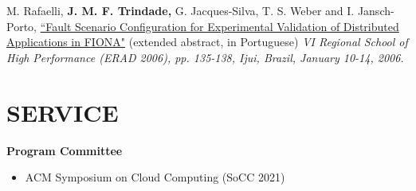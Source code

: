 \documentclass[line,margin]{res}
\begin{document}
\begin{resume}
M. Rafaelli, \textbf{J. M. F. Trindade,} G. Jacques-Silva, T. S. Weber and I. Jansch-Porto, \href{http://joanatrindade.wikidot.com/local--files/curriculum/erad2006.pdf}{``Fault Scenario Configuration for Experimental Validation of Distributed Applications in FIONA"} (extended abstract, in Portuguese) \textit{VI Regional School of High Performance (ERAD 2006), pp. 135-138, Ijui, Brazil, January 10-14, 2006.}




\section{SERVICE}
  \textbf{Program Committee}
  \begin{itemize}  \itemsep -2pt
  \item ACM Symposium on Cloud Computing (SoCC 2021)
  \end{itemize}


\end{resume}
\end{document}
